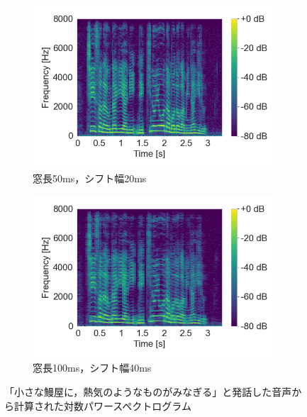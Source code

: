 \begin{figure}[tb]
    \begin{subfigure}[b]{0.48\textwidth}
        \centering
        \includegraphics[width=\textwidth]{./figure/sec2/spectrogram_4.png}
        \caption{窓長50ms，シフト幅20ms}
        \label{sec2:fig:spectrogram3}
    \end{subfigure}
    \begin{subfigure}[b]{0.48\textwidth}
        \centering
        \includegraphics[width=\textwidth]{./figure/sec2/spectrogram_8.png}
        \caption{窓長100ms，シフト幅40ms}
        \label{sec2:fig:spectrogram4}
    \end{subfigure}
    \caption{「小さな鰻屋に，熱気のようなものがみなぎる」と発話した音声から計算された対数パワースペクトログラム}
    \label{sec2:fig:log_power_spectrograms}
\end{figure}

